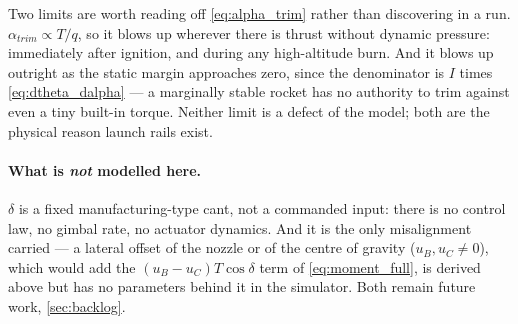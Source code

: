 {Two limits are worth reading off \autoref{eq:alpha_trim} rather than discovering in a run.
$\alpha_{trim} \propto T/q$, so it blows up wherever there is thrust without dynamic pressure:
immediately after ignition, and during any high-altitude burn. And it blows up outright as the
static margin approaches zero, since the denominator is $I$ times
\autoref{eq:dtheta_dalpha} --- a marginally stable rocket has no authority to trim against even
a tiny built-in torque. Neither limit is a defect of the model; both are the physical reason
launch rails exist.

\paragraph{What is \emph{not} modelled here.} $\delta$ is a fixed manufacturing-type cant, not a
commanded input: there is no control law, no gimbal rate, no actuator dynamics. And it is the
only misalignment carried --- a lateral offset of the nozzle or of the centre of gravity
($u_B, u_C \neq 0$), which would add the $(u_B-u_C)T\cos\delta$ term of
\autoref{eq:moment_full}, is derived above but has no parameters behind it in the simulator.
Both remain future work, \autoref{sec:backlog}.}
